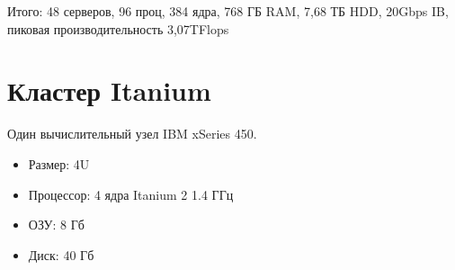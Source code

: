 Итого: 48 серверов, 96 проц, 384 ядра, 768 ГБ RAM, 7,68 ТБ HDD, 20Gbps IB, пиковая производительность 3,07TFlops


\section{Кластер Itanium}
Один вычислительный узел IBM xSeries 450.
\begin{itemize}
  \item Размер: 4U
  \item Процессор: 4 ядра Itanium 2 1.4 ГГц
  \item ОЗУ: 8 Гб
  \item Диск: 40 Гб
\end{itemize}

